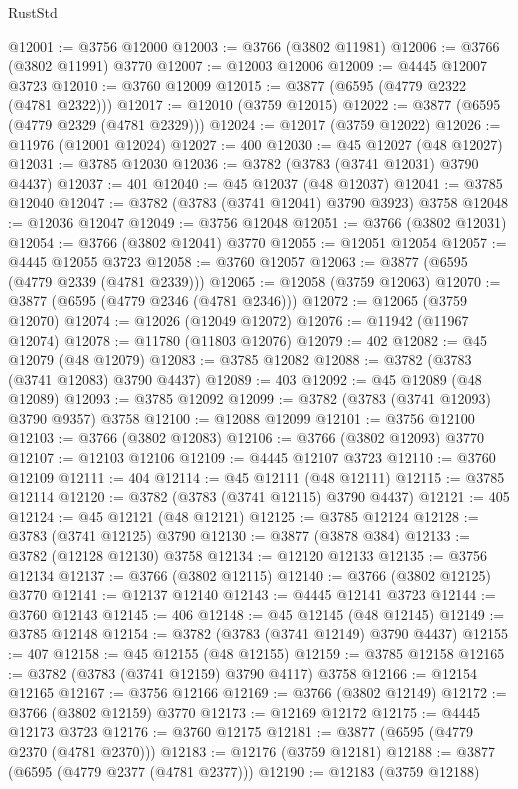 \begin{lexlean}{RustStd}
\begin{coremodule}
@12001 := @3756 @12000
@12003 := @3766 (@3802 @11981)
@12006 := @3766 (@3802 @11991) @3770
@12007 := @12003 @12006
@12009 := @4445 @12007 @3723
@12010 := @3760 @12009
@12015 := @3877 (@6595 (@4779 @2322 (@4781 @2322)))
@12017 := @12010 (@3759 @12015)
@12022 := @3877 (@6595 (@4779 @2329 (@4781 @2329)))
@12024 := @12017 (@3759 @12022)
@12026 := @11976 (@12001 @12024)
@12027 := 400
@12030 := @45 @12027 (@48 @12027)
@12031 := @3785 @12030
@12036 := @3782 (@3783 (@3741 @12031) @3790 @4437)
@12037 := 401
@12040 := @45 @12037 (@48 @12037)
@12041 := @3785 @12040
@12047 := @3782 (@3783 (@3741 @12041) @3790 @3923) @3758
@12048 := @12036 @12047
@12049 := @3756 @12048
@12051 := @3766 (@3802 @12031)
@12054 := @3766 (@3802 @12041) @3770
@12055 := @12051 @12054
@12057 := @4445 @12055 @3723
@12058 := @3760 @12057
@12063 := @3877 (@6595 (@4779 @2339 (@4781 @2339)))
@12065 := @12058 (@3759 @12063)
@12070 := @3877 (@6595 (@4779 @2346 (@4781 @2346)))
@12072 := @12065 (@3759 @12070)
@12074 := @12026 (@12049 @12072)
@12076 := @11942 (@11967 @12074)
@12078 := @11780 (@11803 @12076)
@12079 := 402
@12082 := @45 @12079 (@48 @12079)
@12083 := @3785 @12082
@12088 := @3782 (@3783 (@3741 @12083) @3790 @4437)
@12089 := 403
@12092 := @45 @12089 (@48 @12089)
@12093 := @3785 @12092
@12099 := @3782 (@3783 (@3741 @12093) @3790 @9357) @3758
@12100 := @12088 @12099
@12101 := @3756 @12100
@12103 := @3766 (@3802 @12083)
@12106 := @3766 (@3802 @12093) @3770
@12107 := @12103 @12106
@12109 := @4445 @12107 @3723
@12110 := @3760 @12109
@12111 := 404
@12114 := @45 @12111 (@48 @12111)
@12115 := @3785 @12114
@12120 := @3782 (@3783 (@3741 @12115) @3790 @4437)
@12121 := 405
@12124 := @45 @12121 (@48 @12121)
@12125 := @3785 @12124
@12128 := @3783 (@3741 @12125) @3790
@12130 := @3877 (@3878 @384)
@12133 := @3782 (@12128 @12130) @3758
@12134 := @12120 @12133
@12135 := @3756 @12134
@12137 := @3766 (@3802 @12115)
@12140 := @3766 (@3802 @12125) @3770
@12141 := @12137 @12140
@12143 := @4445 @12141 @3723
@12144 := @3760 @12143
@12145 := 406
@12148 := @45 @12145 (@48 @12145)
@12149 := @3785 @12148
@12154 := @3782 (@3783 (@3741 @12149) @3790 @4437)
@12155 := 407
@12158 := @45 @12155 (@48 @12155)
@12159 := @3785 @12158
@12165 := @3782 (@3783 (@3741 @12159) @3790 @4117) @3758
@12166 := @12154 @12165
@12167 := @3756 @12166
@12169 := @3766 (@3802 @12149)
@12172 := @3766 (@3802 @12159) @3770
@12173 := @12169 @12172
@12175 := @4445 @12173 @3723
@12176 := @3760 @12175
@12181 := @3877 (@6595 (@4779 @2370 (@4781 @2370)))
@12183 := @12176 (@3759 @12181)
@12188 := @3877 (@6595 (@4779 @2377 (@4781 @2377)))
@12190 := @12183 (@3759 @12188)

\end{coremodule}
\end{lexlean}
